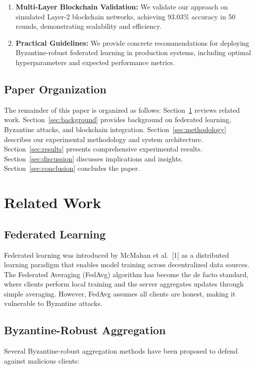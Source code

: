 \documentclass[12pt,a4paper,onecolumn]{article}
\begin{document}
\begin{enumerate}
    \item \textbf{Multi-Layer Blockchain Validation:} We validate our approach on simulated Layer-2 blockchain networks, achieving 93.03\% accuracy in 50 rounds, demonstrating scalability and efficiency.
    
    \item \textbf{Practical Guidelines:} We provide concrete recommendations for deploying Byzantine-robust federated learning in production systems, including optimal hyperparameters and expected performance metrics.
\end{enumerate}

\subsection{Paper Organization}

The remainder of this paper is organized as follows: Section~\ref{sec:related} reviews related work. Section~\ref{sec:background} provides background on federated learning, Byzantine attacks, and blockchain integration. Section~\ref{sec:methodology} describes our experimental methodology and system architecture. Section~\ref{sec:results} presents comprehensive experimental results. Section~\ref{sec:discussion} discusses implications and insights. Section~\ref{sec:conclusion} concludes the paper.

\section{Related Work}
\label{sec:related}

\subsection{Federated Learning}

Federated learning was introduced by McMahan et al.~[1] as a distributed learning paradigm that enables model training across decentralized data sources. The Federated Averaging (FedAvg) algorithm has become the de facto standard, where clients perform local training and the server aggregates updates through simple averaging. However, FedAvg assumes all clients are honest, making it vulnerable to Byzantine attacks.

\subsection{Byzantine-Robust Aggregation}

Several Byzantine-robust aggregation methods have been proposed to defend against malicious clients:
\end{document}
